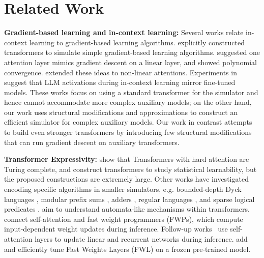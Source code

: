 \section{Related Work}
\vspace{-0.2em}
\textbf{Gradient-based learning and in-context learning:} Several works relate in-context learning to gradient-based learning algorithms. \citet{bai2023transformers} explicitly constructed transformers to simulate simple gradient-based learning algorithms. \citet{mahankali2023one,ahn2023transformers} suggested one attention layer mimics gradient descent on a linear layer, and \citet{zhang2023trained} showed polynomial convergence. 
\citet{cheng2023transformers,han2023context} extended these ideas to non-linear attentions. Experiments in \citet{dai2022gpt} suggest that LLM activations during in-context learning mirror fine-tuned models. 
These works focus on using a standard transformer for the simulator and hence cannot accommodate more complex auxiliary models; on the other hand, our work uses structural modifications and approximations to construct an efficient simulator for complex auxiliary models.
Our work in contrast attempts to build even stronger transformers by introducing few structural modifications that can run gradient descent on auxiliary transformers.


\textbf{Transformer Expressivity:}
\citet{perez2021attention,pérez2018on} show that Transformers with hard attention are Turing complete, and 
\citet{wei2022statistically} construct transformers to study statistical learnability, but the proposed constructions are extremely large.
Other works have investigated encoding specific algorithms in smaller simulators, e.g. bounded-depth Dyck languages \citep{yao2021self}, modular prefix sums \citep{anil2022exploring}, adders \citep{nanda2023progress}, regular languages \citep{bhattamishra2020ability}, and sparse logical predicates \citep{edelman2022inductive}. \citet{liu2023transformers} aim to understand automata-like mechanisms within transformers.
\citet{ba2016using} connect self-attention and fast weight programmers (FWPs), which compute input-dependent weight updates during inference. Follow-up works~\citep{schlag2021linear,irie2021going} use self-attention layers to update linear and recurrent networks during inference. 
\citet{clark2022meta} add and efficiently tune Fast Weights Layers (FWL) on a frozen pre-trained model.
